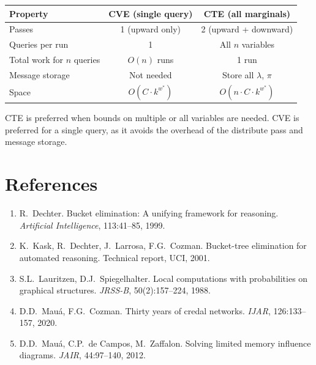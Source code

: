 \documentclass[11pt]{article}
\begin{document}
\begin{center}
\begin{tabular}{lcc}
\toprule
\textbf{Property} & \textbf{CVE (single query)} & \textbf{CTE (all marginals)} \\
\midrule
Passes & 1 (upward only) & 2 (upward + downward) \\
Queries per run & 1 & All $n$ variables \\
Total work for $n$ queries & $O(n)$ runs & 1 run \\
Message storage & Not needed & Store all $\lambda$, $\pi$ \\
Space & $O(C \cdot k^{w^*})$ & $O(n \cdot C \cdot k^{w^*})$ \\
\bottomrule
\end{tabular}
\end{center}

CTE is preferred when bounds on multiple or all variables are needed. CVE is
preferred for a single query, as it avoids the overhead of the distribute pass
and message storage.

\section{References}

\begin{enumerate}
\item R.\ Dechter. Bucket elimination: A unifying framework for reasoning.
      \emph{Artificial Intelligence}, 113:41--85, 1999.
\item K.\ Kask, R.\ Dechter, J.\ Larrosa, F.G.\ Cozman. Bucket-tree elimination
      for automated reasoning. Technical report, UCI, 2001.
\item S.L.\ Lauritzen, D.J.\ Spiegelhalter. Local computations with probabilities
      on graphical structures. \emph{JRSS-B}, 50(2):157--224, 1988.
\item D.D.\ Mau\'a, F.G.\ Cozman. Thirty years of credal networks.
      \emph{IJAR}, 126:133--157, 2020.
\item D.D.\ Mau\'a, C.P.\ de Campos, M.\ Zaffalon. Solving limited memory
      influence diagrams. \emph{JAIR}, 44:97--140, 2012.
\end{enumerate}
\end{document}
